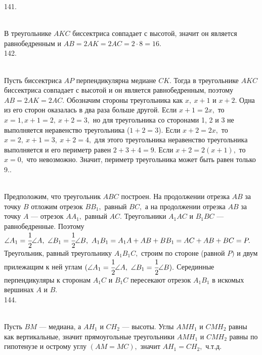 141. \begin{figure}[ht!]
\end{figure}\\
В треугольнике $AKC$ биссектриса совпадает с высотой, значит он является равнобедренным и $AB=2AK=2AC=2\cdot8=16.$\\
142. \begin{figure}[ht!]
\end{figure}\\
Пусть биссектриса $AP$ перпендикулярна медиане $CK.$ Тогда в треугольнике $AKC$ биссектриса совпадает с высотой и он является равнобедренным, поэтому $AB=2AK=2AC.$ Обозначим стороны треугольника как $x,\ x+1$ и $x+2.$ Одна из его сторон оказалась в два раза больше другой. Если $x+1=2x,$ то $x=1, x+1=2,\ x+2=3,$ но для треугольника со сторонами 1, 2 и 3 не выполняется неравенство треугольника ($1+2=3$). Если $x+2=2x,$ то $x=2,\ x+1=3,\ x+2=4,$ для этого треугольника неравенство треугольника выполняется и его периметр равен $2+3+4=9.$ Если $x+2=2(x+1),$ то $x=0,$ что невозможно. Значит, периметр треугольника может быть равен только 9.\newpage{}. \begin{figure}[ht!]
\end{figure}\\
Предположим, что треугольник $ABC$ построен. На продолжении отрезка $AB$ за точку $B$ отложим отрезок $BB_1,$ равный $BC,$ а на продолжении отрезка $AB$ за точку $A$ --- отрезок $AA_1,$ равный $AC.$ Треугольники $A_1AC$ и $B_1BC$ --- равнобедренные. Поэтому  $\angle A_1 = \cfrac{1}{2} \angle A,\  \angle B_1 = \cfrac{1}{2} \angle B,\ A_1B_1 = A_1A + AB + BB_1 = AC + AB + BC = P.$ Треугольник, равный треугольнику $A_1B_1C,$ строим по стороне (равной $P)$ и двум прилежащим к ней углам
$(\angle A_1 = \cfrac{1}{2}\angle A,\ \angle B_1 =\cfrac{1}{2}\angle B).$  Серединные перпендикуляры к сторонам $A_1C$ и $B_1C$ пересекают отрезок $A_1B_1$ в искомых вершинах $A$ и $B.$\\
144. \begin{figure}[ht!]
\end{figure}\\
Пусть $BM$ --- медиана, а $AH_1$ и $CH_2$ --- высоты. Углы $AMH_1$ и $CMH_2$ равны как вертикальные, значит прямоугольные треугольники $AMH_1$ и $CMH_2$ равны по гипотенузе и острому углу $(AM=MC),$ значит $AH_1=CH_2,$ ч.т.д.\\
